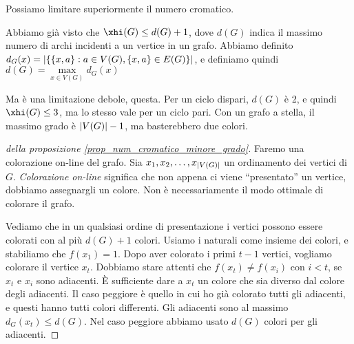 	Possiamo limitare superiormente il numero cromatico.
	\begin{prop}
		\label{prop_num_cromatico_minore_grado}
		Abbiamo gi\`a visto che $\xhi(G) \le d(G) + 1$, dove $d(G)$ indica il massimo numero di archi incidenti a un vertice in un grafo.
		Abbiamo definito $d_G(x) = \left\lvert{\{ \{x,a\} : a \in V(G), \{x,a\} \in E(G) \}}\right\rvert$, e definiamo quindi $d(G) = \max\limits_{x \in V(G)} d_G(x)$
	\end{prop}
	Ma \`e una limitazione debole, questa.
	Per un ciclo dispari, $d(G)$ \`e 2, e quindi $\xhi(G) \le 3$, ma lo stesso vale per un ciclo pari.
	Con un grafo a stella, il massimo grado \`e $\left\lvert{V(G)}\right\rvert - 1$, ma basterebbero due colori.

	\begin{proof}[della proposizione \ref{prop_num_cromatico_minore_grado}]
		Faremo una colorazione on-line del grafo.
		Sia $x_1, x_2, \dots, x_{\left\lvert{V(G)}\right\rvert}$ un ordinamento dei vertici di $G$.
		\emph{Colorazione on-line} significa che non appena ci viene ``presentato'' un vertice, dobbiamo assegnargli un colore.
		Non \`e necessariamente il modo ottimale di colorare il grafo.

		Vediamo che in un qualsiasi ordine di presentazione i vertici possono essere colorati con al pi\`u $d(G) + 1$ colori.
		Usiamo i naturali come insieme dei colori, e stabiliamo che $f(x_1) = 1$.
		Dopo aver colorato i primi $t-1$ vertici, vogliamo colorare il vertice $x_t$.
		Dobbiamo stare attenti che $f(x_t) \neq f(x_i)$ con $i < t$, se $x_t$ e $x_i$ sono adiacenti.
		\`E sufficiente dare a $x_t$ un colore che sia diverso dal colore degli adiacenti.
		Il caso peggiore \`e quello in cui ho gi\`a colorato tutti gli adiacenti, e questi hanno tutti colori differenti.
		Gli adiacenti sono al massimo $d_G(x_t) \le d(G)$.
		Nel caso peggiore abbiamo usato $d(G)$ colori per gli adiacenti.
	\end{proof}

